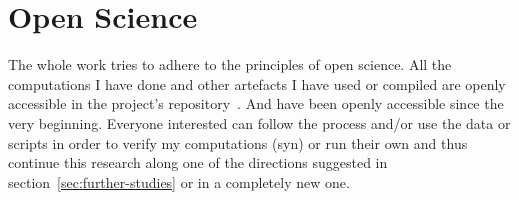 \begin{comment}
"each preconceived idea should earn
its way into your analysis-including your own ideas from previous studies"(p.68)

TODO: Check against my analysis:
"Be careful about applying a language of intention,
motivation, or strategies unless the data support your assertions. You cannot assume
what is in someone' s mind-particularly if he or she does not tell you."(p.68)

"Take an examined stance about whose point of view your codes reflect,"(p.69)

\end{comment}

\section{Open Science}

The whole work tries to adhere to the principles of open science. %
All the computations I have done and other artefacts I have used or compiled are openly accessible in the project's repository~\cite{github}.
And have been openly accessible since the very beginning.
Everyone interested can follow the process and/or use the data or scripts in order to verify my computations (syn) or run their own and thus continue this research along one of the directions suggested in section~\ref{sec:further-studies} or in a completely new one.

